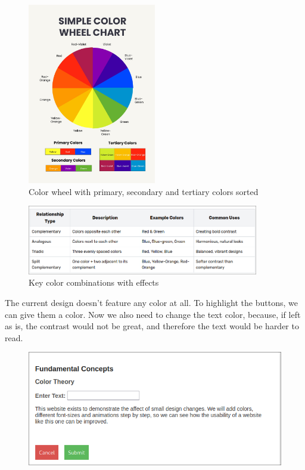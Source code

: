 \begin{figure} [H]
    \center
    \includegraphics [width=0.5\textwidth] {images/paul/colorWheel.jpg}
    \caption{Color wheel with primary, secondary and tertiary colors sorted \autocite{ColorWheel:Img}}
\end{figure}

\begin{figure} [H]
    \centering
    \includegraphics [width=0.9\textwidth] {images/paul/colorRelations.png}
    \caption{Key color combinations with effects \autocite{ColorCombinations:Img}}
\end{figure}

\newpage

The current design doesn't feature any color at all. To highlight the buttons, we can give them a color. Now we also need to change the text color, because, if left as is, the contrast would not be great, and therefore the text would be harder to read. \autocite{Paul:ColorTheoryForBeginners}
    
    \begin{figure} [H]
        \center
        \includegraphics [width=1\textwidth] {images/paul/usabilityExamples/ColorTheoryExample.png}
        \caption{}
    \end{figure}

